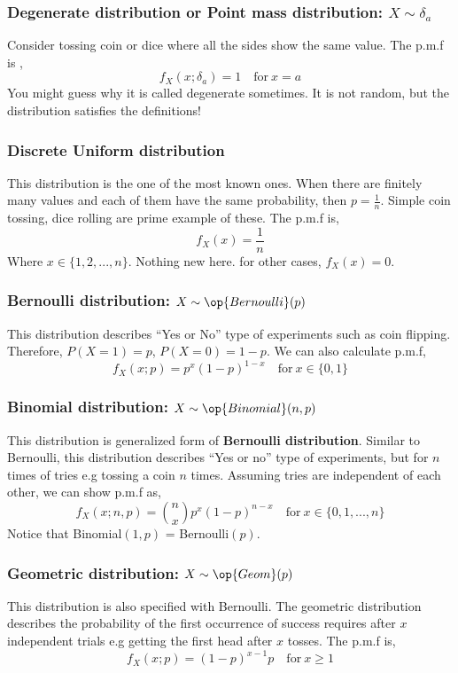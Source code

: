 \subsubsection{Degenerate distribution or Point mass distribution: $X \sim \delta_a$}
Consider tossing coin or dice where all the sides show the same value. The p.m.f is ,
\[f_X(x; \delta_a) = 1 \quad \text{for} \ x = a\]
You might guess why it is called degenerate sometimes. It is not random, but the distribution satisfies the definitions!
\subsubsection{Discrete Uniform distribution}
This distribution is the one of the most known ones. When there are finitely many values and each of them have the same probability, then
$p = \frac{1}{n}$. Simple coin tossing, dice rolling are prime example of these. The p.m.f is,
\[f_X(x) = \frac{1}{n}\]
Where $x \in \{1,2,...,n \}$. Nothing new here.
for other cases, $f_X(x) = 0$.
\subsubsection*{Bernoulli distribution: $X \sim \op{Bernoulli}(p)$ }
This distribution describes ``Yes or No'' type of experiments such as coin flipping. Therefore, $P(X = 1) = p$, $P(X = 0) = 1-p$. We can
also calculate p.m.f,
\[f_X(x; p) = p^x(1-p)^{1-x} \quad \text{for} \ x \in \{0,1\}\]

\subsubsection*{Binomial distribution:  $ X \sim \op{Binomial}(n,p)$}
This distribution is generalized form of \textbf{Bernoulli distribution}. Similar to Bernoulli, this distribution describes ``Yes or no''
type of experiments, but for $n$ times of tries e.g tossing a coin $n$ times. Assuming tries are independent of each other, we can show p.m.f as,
\[f_X(x; n,p) = \binom{n}{x}p^x(1-p)^{n-x} \quad \text{for} \ x \in \{0,1,...,n\}\]
Notice that Binomial$(1,p)$ = Bernoulli$(p)$.
\subsubsection*{Geometric distribution: $X \sim \op{Geom}(p)$}
This distribution is also specified with Bernoulli. The geometric distribution describes the probability of the first occurrence of success
requires after $x$ independent trials e.g getting the first head after $x$ tosses. The p.m.f is,
\[ f_{X}(x; p) = (1-p)^{x-1}p \quad \text{for} \ x \ge 1 \]
